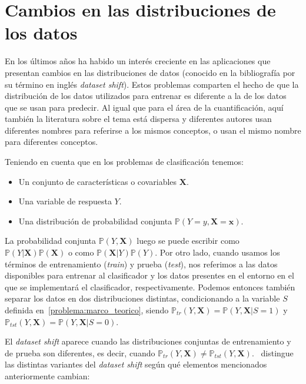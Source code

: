 \section{Cambios en las distribuciones de los datos}\label{problema:cambios}

En los últimos años ha habido un interés creciente en las aplicaciones que
presentan cambios en las distribuciones de datos (conocido en la bibliografía
por su término en inglés {\it dataset shift\/}). Estos problemas comparten el
hecho de que la distribución de los datos utilizados para entrenar es diferente
a la de los datos que se usan para predecir. Al igual que para el área de la
cuantificación, aquí también la literatura sobre el tema está dispersa y
diferentes autores usan diferentes nombres para referirse a los mismos
conceptos, o usan el mismo nombre para diferentes conceptos.

Teniendo en cuenta que en los problemas de clasificación tenemos:

\begin{itemize}
    \item Un conjunto de características o covariables $\boldsymbol{X}$.
    \item Una variable de respuesta $Y$.
    \item Una distribución de probabilidad conjunta
    $\mathbb{P}(Y=y,\boldsymbol{X=x})$.
\end{itemize}

La probabilidad conjunta $\mathbb{P}(Y,\boldsymbol{X})$ luego se puede escribir
como $\mathbb{P}(Y|\boldsymbol{X})\mathbb{P}(\boldsymbol{X})$ o como
$\mathbb{P}(\boldsymbol{X}|Y)\mathbb{P}(Y)$. Por otro lado, cuando usamos los
términos de entrenamiento ({\it train\/}) y prueba ({\it test\/}), nos referimos
a las datos disponibles para entrenar al clasificador y los datos presentes en
el entorno en el que se implementará el clasificador, respectivamente. Podemos
entonces también separar los datos en dos distribuciones distintas,
condicionando a la variable $S$ definida en~\ref{problema:marco_teorico}, siendo
$\mathbb{P}_{tr}(Y,\boldsymbol{X})=\mathbb{P}(Y,\boldsymbol{X}|S=1)$ y
$\mathbb{P}_{tst}(Y,\boldsymbol{X})=\mathbb{P}(Y,\boldsymbol{X}|S=0)$.

El {\it dataset shift\/} aparece cuando las distribuciones conjuntas de
entrenamiento y de prueba son diferentes, es decir, cuando
$\mathbb{P}_{tr}(Y,\boldsymbol{X}) \neq
\mathbb{P}_{tst}(Y,\boldsymbol{X})$.~\citet{moreno2012unifying} distingue las
distintas variantes del {\it dataset shift\/} según qué elementos mencionados
anteriormente cambian:

